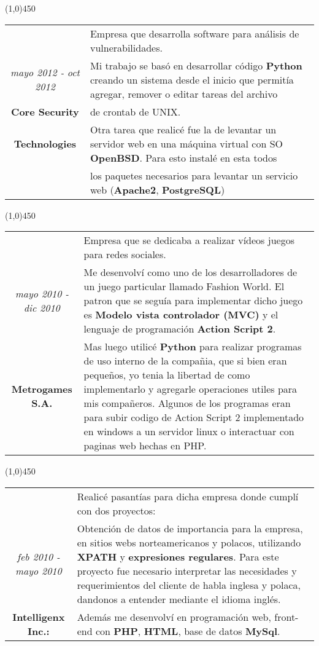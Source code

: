 \begin{center}
\line(1,0){450}
\end{center}
\begin{tabular}{c|p{12.5cm}}
& \large Empresa que desarrolla software para análisis de vulnerabilidades.\\
\large\textit{mayo 2012 - oct 2012} &  \large Mi trabajo se basó en desarrollar código \textbf{Python} creando un sistema desde el inicio que permitía agregar, remover o editar tareas del archivo \\
\large\textbf{Core Security} & \large  de crontab de UNIX.\\
\large\textbf{Technologies} & \large  Otra tarea que realicé fue la de levantar un servidor web en una máquina virtual con SO \textbf{OpenBSD}. Para esto instalé en esta todos\\
& \large los paquetes necesarios para levantar un servicio web (\textbf{Apache2}, \textbf{PostgreSQL}) \\
\end{tabular}

\begin{center}
\line(1,0){450}
\end{center}
\noindent
\begin{tabular}{c|p{12.5cm}}
& \large Empresa que se dedicaba a realizar vídeos juegos para redes sociales.\\
\large\textit{mayo 2010 - dic 2010} &  \large Me desenvolví como uno de los desarrolladores de un juego particular llamado Fashion World. El patron que se seguía para implementar dicho juego es \textbf{Modelo vista controlador (MVC)} y el lenguaje de programación \textbf{Action Script 2}.\\
\large\textbf{Metrogames S.A.} & \large Mas luego utilicé \textbf{Python} para realizar programas de uso interno de la compañia, que si bien eran pequeños, yo tenia la libertad de como implementarlo y agregarle operaciones utiles para mis compañeros. Algunos de los programas eran para subir codigo de Action Script 2 implementado en windows a un servidor linux o interactuar con paginas web hechas en PHP.
\end{tabular}

\begin{center}
\line(1,0){450}
\end{center}
\noindent
\begin{tabular}{c|p{12.5cm}}
& \large Realicé pasantías para dicha empresa donde cumplí con dos proyectos:\\
\large\textit{feb 2010 - mayo 2010} & \large Obtención de datos de importancia para la empresa, en sitios webs norteamericanos y polacos, utilizando \textbf{XPATH} y \textbf{expresiones regulares}.  Para este proyecto fue necesario interpretar las necesidades y requerimientos del cliente de habla inglesa y polaca, dandonos a entender mediante el idioma inglés.\\
\large\textbf{Intelligenx Inc.:} & \large Además me desenvolví en programación web, front-end con \textbf{PHP}, \textbf{HTML}, base de datos \textbf{MySql}.
\end{tabular}

